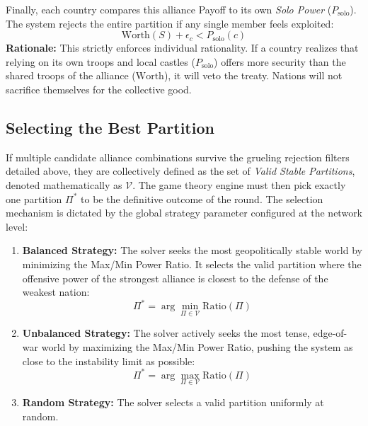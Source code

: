 Finally, each country compares this alliance Payoff to its own \textit{Solo Power} ($P_{\text{solo}}$). The system rejects the entire partition if any single member feels exploited:
\begin{equation}
\text{Worth}(S) + \epsilon_c < P_{\text{solo}}(c)
\end{equation}
\textbf{Rationale:} This strictly enforces individual rationality. If a country realizes that relying on its own troops and local castles ($P_{\text{solo}}$) offers more security than the shared troops of the alliance ($\text{Worth}$), it will veto the treaty. Nations will not sacrifice themselves for the collective good.

\subsection{Selecting the Best Partition}
If multiple candidate alliance combinations survive the grueling rejection filters detailed above, they are collectively defined as the set of \textit{Valid Stable Partitions}, denoted mathematically as $\mathcal{V}$. The game theory engine must then pick exactly one partition $\Pi^*$ to be the definitive outcome of the round. The selection mechanism is dictated by the global strategy parameter configured at the network level:

\begin{enumerate}
    \item \textbf{Balanced Strategy:} The solver seeks the most geopolitically stable world by minimizing the Max/Min Power Ratio. It selects the valid partition where the offensive power of the strongest alliance is closest to the defense of the weakest nation:
    \begin{equation}
    \Pi^* = \arg\min_{\Pi \in \mathcal{V}} \text{Ratio}(\Pi)
    \end{equation}
    
    \item \textbf{Unbalanced Strategy:} The solver actively seeks the most tense, edge-of-war world by maximizing the Max/Min Power Ratio, pushing the system as close to the instability limit as possible:
    \begin{equation}
    \Pi^* = \arg\max_{\Pi \in \mathcal{V}} \text{Ratio}(\Pi)
    \end{equation}
    
    \item \textbf{Random Strategy:} The solver selects a valid partition uniformly at random.
\end{enumerate}


